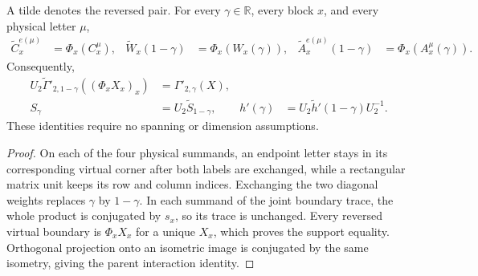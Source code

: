 \begin{lemma}
    \label{thm:mpo_joint_endpoint_swap_support}
    \leanok
    A tilde denotes the reversed pair. For every $\gamma\in\mathbb R$,
    every block $x$, and every physical letter $\mu$,
    \begin{align}
        \widetilde C_x^{e(\mu)}           & =\Phi_x(C_x^\mu),         &
        \widetilde W_x(1-\gamma)          & =\Phi_x(W_x(\gamma)),     &
        \widetilde A_x^{e(\mu)}(1-\gamma) & =\Phi_x(A_x^\mu(\gamma)).
        \label{eq:mpo_joint_endpoint_swap_letters}
    \end{align}
    Consequently,
    \begin{align}
        U_2\widetilde\Gamma'_{2,1-\gamma}((\Phi_xX_x)_x)
                   & =\Gamma'_{2,\gamma}(X),                \\
        S_\gamma   & =U_2\widetilde S_{1-\gamma},         &
        h'(\gamma) & =U_2\widetilde h'(1-\gamma)U_2^{-1}.
        \label{eq:mpo_joint_endpoint_swap_support}
    \end{align}
    These identities require no spanning or dimension assumptions.
\end{lemma}
\begin{proof}
    \leanok
    On each of the four physical summands, an endpoint letter stays in its
    corresponding virtual corner after both labels are exchanged, while a
    rectangular matrix unit keeps its row and column indices. Exchanging
    the two diagonal weights replaces $\gamma$ by $1-\gamma$.
    In each summand of the joint boundary trace, the whole product is
    conjugated by $s_x$, so its trace is unchanged. Every reversed virtual
    boundary is $\Phi_xX_x$ for a unique $X_x$, which proves the support
    equality. Orthogonal projection onto an isometric image is conjugated
    by the same isometry, giving the parent interaction identity.
\end{proof}

